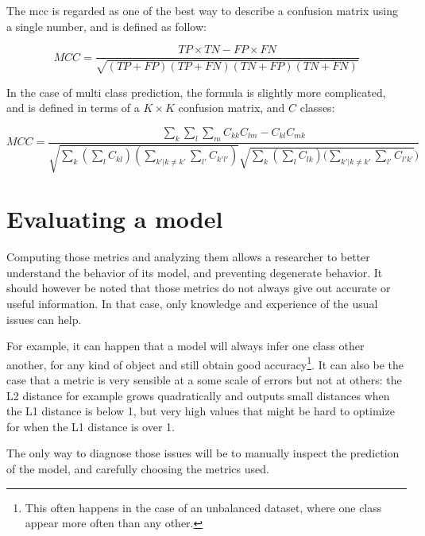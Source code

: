 The \gls{mcc} is regarded as one of the best way to describe a confusion matrix using a single number, and is defined as follow:

\begin{equation}
	MCC = \frac{TP \times TN - FP \times FN}{\sqrt{(TP + FP)(TP + FN)(TN + FP)(TN + FN)}}
\end{equation}

In the case of multi class prediction, the formula is slightly more complicated, and is defined in terms of a $K \times K$ confusion matrix, and $C$ classes\cite{gorodkin2004}:


\begin{equation}
	MCC = \frac{\sum_k \sum_l \sum_m C_{kk} C_{lm} - C_{kl}C_{mk}}
	{\sqrt{\sum_k (\sum_l C_{kl})(\sum_{k'|k \neq k'} \sum_{l'}C_{k'l'})}
	\sqrt{\sum_k (\sum_l C_{lk})(\sum_{k'|k \neq k'} \sum_{l'}C_{l'k'}})}
\end{equation}
\section{Evaluating a model}
Computing those metrics and analyzing them allows a researcher to better understand the behavior of its model, and preventing degenerate behavior. It should however be noted that those metrics do not always give out accurate or useful information. In that case, only knowledge and experience of the usual issues can help.

For example, it can happen that a model will always infer one class other another, for any kind of object and still obtain good accuracy\footnote{This often happens in the case of an unbalanced dataset, where one class appear more often than any other.}. It can also be the case that a metric is very sensible at a some scale of errors but not at others: the L2 distance for example grows quadratically and outputs small distances when the L1 distance is below 1, but very high values that might be hard to optimize for when the L1 distance is over 1.

The only way to diagnose those issues will be to manually inspect the prediction of the model, and carefully choosing the metrics used. 

